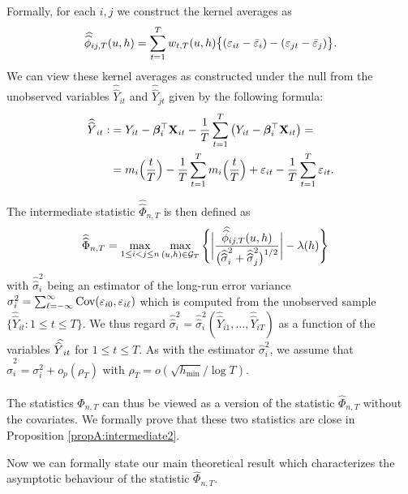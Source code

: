 \documentclass[a4paper,12pt]{article}
\newcommand{\doublehat}[1]{\skew{5.5}\widehat{\widehat{#1}}}
\newcommand{\doublehattwo}[1]{\widehat{\widehat{#1}}}
\begin{document}
Formally, for each $i,j$ we construct the kernel averages as 
\[\doublehat{\phi}_{ij,T}(u,h) = \sum_{t=1}^T w_{t,T}(u,h) \big\{ (\varepsilon_{it} - \bar{\varepsilon}_i) - (\varepsilon_{jt} - \bar{\varepsilon}_j)  \big\}. \]
We can view these kernel averages as constructed under the null from the unobserved variables $\doublehattwo{Y}_{it}$ and  $\doublehattwo{Y}_{jt}$ given by the following formula: 
\begin{align*}
\doublehattwo{Y}_{it} :&= Y_{it} - \bfbeta_i^\top \mathbf{X}_{it} -  \frac{1}{T}\sum_{t=1}^T \big(Y_{it} - \bfbeta_i^\top \mathbf{X}_{it}\big) =\\
&=m_i \Big( \frac{t}{T} \Big)  - \frac{1}{T}\sum_{t=1}^T  m_i \Big( \frac{t}{T} \Big) + \varepsilon_{it} - \frac{1}{T}\sum_{t=1}^T \varepsilon_{it}.
\end{align*}

The intermediate statistic $\doublehattwo{\Phi}_{n, T}$ is then defined as 
\begin{align}\label{eq:Phi_doublehat}
\doublehattwo{\Phi}_{n,T} &= \max_{1 \le i < j \le n}\max_{(u,h) \in \mathcal{G}_T} \Bigg\{\bigg|\frac{\doublehat{\phi}_{ij,T}(u,h)}{\big(\doublehattwo{\sigma}_i^2 + \doublehattwo{\sigma}_j^2\big)^{1/2}}\bigg| - \lambda(h)\Bigg\}
\end{align}
with $\doublehattwo{\sigma}_i^2$ being an estimator of the long-run error variance $\sigma_i^2 = \sum\nolimits_{\ell=-\infty}^{\infty} \textnormal{Cov}(\varepsilon_{i0}, \varepsilon_{i\ell})$ which is computed from the unobserved sample $\{ \doublehattwo{Y}_{it} : 1 \le t \le T \}$. We thus regard $\doublehattwo{\sigma}_i^2 = \doublehattwo{\sigma}_i^2(\doublehattwo{Y}_{i1},\ldots,\doublehattwo{Y}_{iT})$ as a function of the variables $\doublehat{Y}_{it}$ for $1 \le t \le T$. As with the estimator $\widehat{\sigma}_i^2$, we assume that $\doublehattwo{\sigma}_i^2 = \sigma_i^2 + o_p(\rho_T)$ with $\rho_T = o(\sqrt{h_{\min}}/\log T)$. 

The statistics $\doublehattwo{\Phi}_{n,T}$ can thus be viewed as a version of the statistic $\widehat{\Phi}_{n,T}$ without the covariates. We formally prove that these two statistics are close in Proposition \ref{propA:intermediate2}.

Now we can formally state our main theoretical result which characterizes the asymptotic behaviour of the statistic $\widehat{\Phi}_{n,T}$. 
\end{document}
